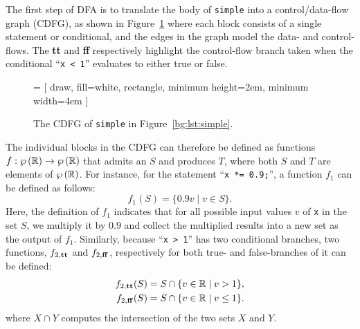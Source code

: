 The first step of DFA is to translate the body of \verb|simple| into a
control/data-flow graph (CDFG), as shown in Figure~\ref{bg:fig:cdfg} where
each block consists of a single statement or conditional, and the edges in
the graph model the data- and control-flows.  The \textbf{tt} and \textbf{ff}
respectively highlight the control-flow branch taken when the conditional
\mbox{``\texttt{x < 1}''} evaluates to either true or false.
\begin{figure}[ht]
    \centering
     = [
        draw,
        fill=white,
        rectangle,
        minimum height=2em,
        minimum width=4em
    ]
    \caption{%
        The CDFG of \texttt{simple} in Figure~\ref{bg:lst:simple}.
    }\label{bg:fig:cdfg}
\end{figure}

The individual blocks in the CDFG can therefore be defined as functions $f:
\wp\left({\mathbb{R}}\right) \to \wp\left({\mathbb{R}}\right)$ that admits an $S$ and produces
$T$, where both $S$ and $T$ are elements of $\wp\left({\mathbb{R}}\right)$.  For
instance, for the statement ``\texttt{x *= 0.9;}'', a function $f_1$ can be
defined as follows:
\begin{equation}
    f_1(S) = \{ 0.9 v \mid v \in S \}.
\end{equation}
Here, the definition of $f_1$ indicates that for all possible input values
$v$ of \verb|x| in the set $S$, we multiply it by $0.9$ and collect the
multiplied results into a new set as the output of $f_1$.  Similarly, because
\mbox{``\texttt{x > 1}''} has two conditional branches, two functions,
$f_{2,\mathbf{tt}}$ and $f_{2, \mathbf{ff}}$, respectively for both true- and
false-branches of it can be defined:
\begin{equation}
    \begin{aligned}
        f_{2, \mathbf{tt}}(S) &= S \cap \{ v \in \mathbb{R} \mid v > 1 \}, \\
        f_{2, \mathbf{ff}}(S) &= S \cap \{ v \in \mathbb{R} \mid v \leq 1 \}.
    \end{aligned}
\end{equation}
where $X \cap Y$ computes the intersection of the two sets $X$ and $Y$.

